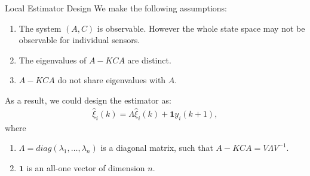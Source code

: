 \documentclass[10pt]{beamer}
\begin{document}

\begin{frame}{Local Estimator Design}
  We make the following assumptions:
  \begin{enumerate}
    \item The system $(A,C)$ is observable. However the whole state space may not be observable for individual sensors.  
    \item The eigenvalues of $A-KCA$ are distinct.   
    \item $A-KCA$ do not share eigenvalues with $A$.
  \end{enumerate}
  As a result, we could design the estimator as:
  \begin{align*}
    \hat \xi_i(k) = \Lambda \hat \xi_i(k) + \mathbf 1 y_i(k+1), 
  \end{align*}  
  where
  \begin{enumerate}
    \item $\Lambda = diag (\lambda_1, \ldots, \lambda_n)$ is a diagonal matrix, such that $A-KCA = V\Lambda V^{-1}.$
      \item $\mathbf 1$ is an all-one vector of dimension $n$.
  \end{enumerate}
\end{frame}
\end{document}
